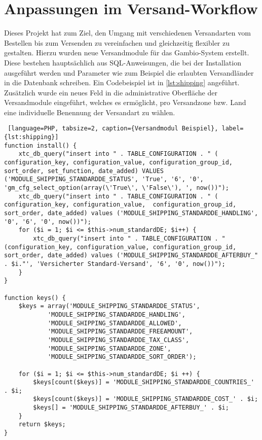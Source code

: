 \section{Anpassungen im Versand-Workflow}
Dieses Projekt hat zum Ziel, den Umgang mit verschiedenen Versandarten vom Bestellen bis zum Versenden zu vereinfachen und gleichzeitig flexibler zu gestalten. 
Hierzu wurden neue Versandmodule für das Gambio-System erstellt. Diese bestehen hauptsächlich aus SQL-Anweisungen, die bei der Installation ausgeführt werden 
und Parameter wie zum Beispiel die erlaubten Versandländer in die Datenbank schreiben. Ein Codebeispiel ist in \autoref{lst:shipping} angeführt. 
Zusätzlich wurde ein neues Feld in die administrative Oberfläche der Versandmodule eingeführt, welches es ermöglicht, 
pro Versandzone bzw. Land eine individuelle Benennung der Versandart zu wählen.
\begin{lstlisting} [language=PHP, tabsize=2, caption={Versandmodul Beispiel}, label={lst:shipping}]
function install() {
	xtc_db_query("insert into " . TABLE_CONFIGURATION . " ( configuration_key, configuration_value, configuration_group_id, sort_order, set_function, date_added) VALUES ('MODULE_SHIPPING_STANDARDDE_STATUS', 'True', '6', '0', 'gm_cfg_select_option(array(\'True\', \'False\'), ', now())");
	xtc_db_query("insert into " . TABLE_CONFIGURATION . " ( configuration_key, configuration_value,  configuration_group_id, sort_order, date_added) values ('MODULE_SHIPPING_STANDARDDE_HANDLING', '0', '6', '0', now())");
	for ($i = 1; $i <= $this->num_standardDE; $i++) {
		xtc_db_query("insert into " . TABLE_CONFIGURATION . " (configuration_key, configuration_value, configuration_group_id, sort_order, date_added) values ('MODULE_SHIPPING_STANDARDDE_AFTERBUY_" . $i."', 'Versicherter Standard-Versand', '6', '0', now())");
	}
}

function keys() {
	$keys = array('MODULE_SHIPPING_STANDARDDE_STATUS',
			'MODULE_SHIPPING_STANDARDDE_HANDLING',
			'MODULE_SHIPPING_STANDARDDE_ALLOWED',
			'MODULE_SHIPPING_STANDARDDE_FREEAMOUNT',
			'MODULE_SHIPPING_STANDARDDE_TAX_CLASS',
			'MODULE_SHIPPING_STANDARDDE_ZONE',
			'MODULE_SHIPPING_STANDARDDE_SORT_ORDER');
	
	for ($i = 1; $i <= $this->num_standardDE; $i ++) {
		$keys[count($keys)] = 'MODULE_SHIPPING_STANDARDDE_COUNTRIES_' . $i;
		$keys[count($keys)] = 'MODULE_SHIPPING_STANDARDDE_COST_' . $i;
		$keys[] = 'MODULE_SHIPPING_STANDARDDE_AFTERBUY_' . $i;
	}
	return $keys;
}
\end{lstlisting}

